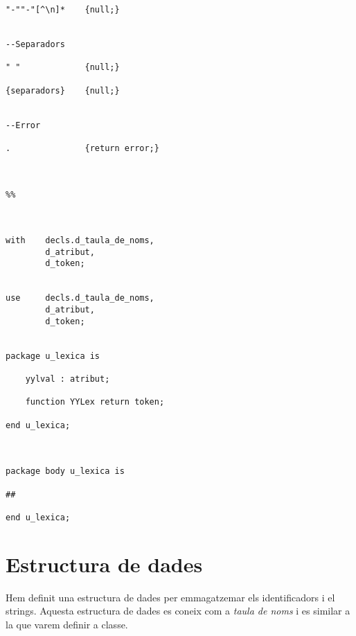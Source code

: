 \documentclass[10pt]{report}
\begin{document}
\begin{lstlisting}[style=Ada]
"-""-"[^\n]*    {null;}


--Separadors

" "             {null;}

{separadors}    {null;}


--Error

.               {return error;}



%%



with    decls.d_taula_de_noms,
        d_atribut,
        d_token;
        

use     decls.d_taula_de_noms,
        d_atribut,
        d_token;


package u_lexica is

    yylval : atribut;

    function YYLex return token;
    
end u_lexica;



package body u_lexica is

##

end u_lexica;

    \end{lstlisting}
    
    \newpage
    \chapter{Estructura de dades}
        Hem definit una estructura de dades per emmagatzemar els identificadors i el strings. Aquesta estructura de dades es coneix com a \textit{taula de noms} i es similar a la que varem definir a classe.
        
    
\end{document}
